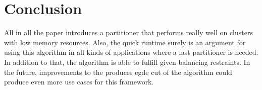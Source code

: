 \documentclass[acmsmall,nonacm,screen,review]{acmart}
\begin{document}
\section{Conclusion}
All in all the paper introduces a partitioner that performs really well on clusters with low memory resources. Also, the quick runtime surely is an argument for using this algorithm in all kinds of applications where a fast partitioner is needed. In addition to that, the algorithm is able to fulfill given balancing restraints. In the future, improvements to the produces egde cut of the algorithm could produce even more use cases for this framework. 


\end{document}

